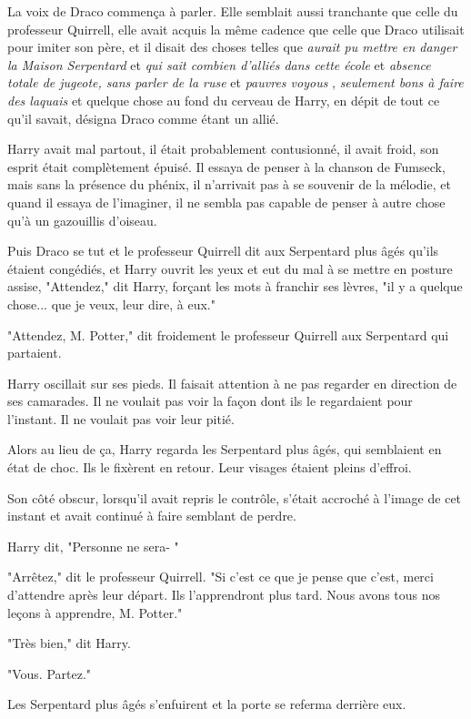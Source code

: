 La voix de Draco commença à parler. Elle semblait aussi tranchante que celle du professeur Quirrell, elle avait acquis la même cadence que celle que Draco utilisait pour imiter son père, et il disait des choses telles que \emph{aurait pu mettre en danger la Maison Serpentard}  et \emph{qui sait combien d'alliés dans cette école}  et \emph{absence totale de jugeote, sans parler de la ruse } et \emph{pauvres voyous} , \emph{seulement bons à faire des laquais}  et quelque chose au fond du cerveau de Harry, en dépit de tout ce qu'il savait, désigna Draco comme étant un allié.

Harry avait mal partout, il était probablement contusionné, il avait froid, son esprit était complètement épuisé. Il essaya de penser à la chanson de Fumseck, mais sans la présence du phénix, il n'arrivait pas à se souvenir de la mélodie, et quand il essaya de l'imaginer, il ne sembla pas capable de penser à autre chose qu'à un gazouillis d'oiseau.

Puis Draco se tut et le professeur Quirrell dit aux Serpentard plus âgés qu'ils étaient congédiés, et Harry ouvrit les yeux et eut du mal à se mettre en posture assise, "Attendez," dit Harry, forçant les mots à franchir ses lèvres, "il y a quelque chose... que je veux, leur dire, à eux."

"Attendez, M. Potter," dit froidement le professeur Quirrell aux Serpentard qui partaient.

Harry oscillait sur ses pieds. Il faisait attention à ne pas regarder en direction de ses camarades. Il ne voulait pas voir la façon dont ils le regardaient pour l'instant. Il ne voulait pas voir leur pitié.

Alors au lieu de ça, Harry regarda les Serpentard plus âgés, qui semblaient en état de choc. Ils le fixèrent en retour. Leur visages étaient pleins d'effroi.

Son côté obscur, lorsqu'il avait repris le contrôle, s'était accroché à l'image de cet instant et avait continué à faire semblant de perdre.

Harry dit, "Personne ne sera- "

"Arrêtez," dit le professeur Quirrell. "Si c'est ce que je pense que c'est, merci d'attendre après leur départ. Ils l'apprendront plus tard. Nous avons tous nos leçons à apprendre, M. Potter."

"Très bien," dit Harry.

"Vous. Partez."

Les Serpentard plus âgés s'enfuirent et la porte se referma derrière eux.

